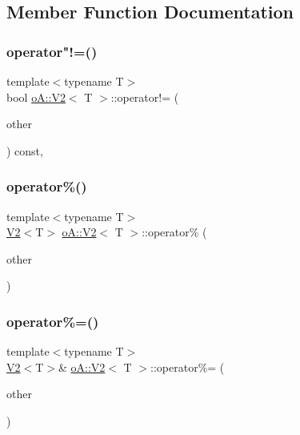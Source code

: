\subsection{Member Function Documentation}
\mbox{\label{structo_a_1_1_v2_a5ca601a9f46507dba0e6a78e4e6fb06e}} 
\subsubsection{\texorpdfstring{operator"!=()}{operator!=()}}
{\footnotesize\ttfamily template$<$typename T$>$ \\
bool \mbox{\hyperlink{structo_a_1_1_v2}{o\+A\+::\+V2}}$<$ T $>$\+::operator!= (\begin{DoxyParamCaption}\item[{const \mbox{\hyperlink{structo_a_1_1_v2}{o\+A\+::\+V2}}$<$ T $>$ \&}]{other }\end{DoxyParamCaption}) const\hspace{0.3cm}{\ttfamily [inline]}, {\ttfamily [noexcept]}}

\mbox{\label{structo_a_1_1_v2_a0566d5d8796320c591462eb26ebffdce}} 
\subsubsection{\texorpdfstring{operator\%()}{operator\%()}}
{\footnotesize\ttfamily template$<$typename T$>$ \\
\mbox{\hyperlink{structo_a_1_1_v2}{V2}}$<$T$>$ \mbox{\hyperlink{structo_a_1_1_v2}{o\+A\+::\+V2}}$<$ T $>$\+::operator\% (\begin{DoxyParamCaption}\item[{const \mbox{\hyperlink{structo_a_1_1_v2}{o\+A\+::\+V2}}$<$ T $>$ \&}]{other }\end{DoxyParamCaption})\hspace{0.3cm}{\ttfamily [inline]}}

\mbox{\label{structo_a_1_1_v2_acd10d3ff2a5744713a159eebd0d89a4e}} 
\subsubsection{\texorpdfstring{operator\%=()}{operator\%=()}}
{\footnotesize\ttfamily template$<$typename T$>$ \\
\mbox{\hyperlink{structo_a_1_1_v2}{V2}}$<$T$>$\& \mbox{\hyperlink{structo_a_1_1_v2}{o\+A\+::\+V2}}$<$ T $>$\+::operator\%= (\begin{DoxyParamCaption}\item[{const \mbox{\hyperlink{structo_a_1_1_v2}{o\+A\+::\+V2}}$<$ T $>$ \&}]{other }\end{DoxyParamCaption})\hspace{0.3cm}{\ttfamily [inline]}}

